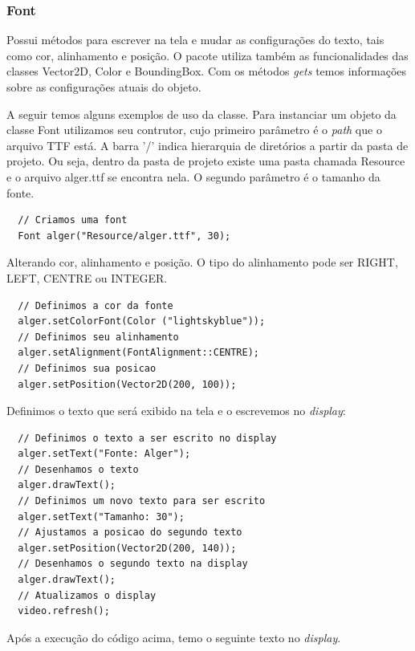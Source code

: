 \subsubsection{Font}
%
%
Possui métodos para escrever na tela e mudar as configurações do texto, tais como cor, alinhamento e posição. O pacote utiliza também as funcionalidades das classes Vector2D, Color e BoundingBox. Com os métodos \textit{gets} temos informações sobre as configurações atuais do objeto.
\par 
A seguir temos alguns exemplos de uso da classe. Para instanciar um objeto da classe Font utilizamos seu contrutor, cujo primeiro parâmetro é o \textit{path} que o arquivo TTF está. A barra '/' indica hierarquia de diretórios a partir da pasta de projeto. Ou seja, dentro da pasta de projeto existe uma pasta chamada Resource e o arquivo alger.ttf se encontra nela. O segundo parâmetro é o tamanho da fonte.
%
\begin{lstlisting}
  // Criamos uma font
  Font alger("Resource/alger.ttf", 30);
\end{lstlisting}
%
\par
Alterando cor, alinhamento e posição. O tipo do alinhamento pode ser RIGHT, LEFT, CENTRE ou INTEGER.
%
\begin{lstlisting}
  // Definimos a cor da fonte
  alger.setColorFont(Color ("lightskyblue"));
  // Definimos seu alinhamento
  alger.setAlignment(FontAlignment::CENTRE);
  // Definimos sua posicao
  alger.setPosition(Vector2D(200, 100));
\end{lstlisting}
%
\par 
Definimos o texto que será exibido na tela e o escrevemos no \textit{display}:
%
\begin{lstlisting}
  // Definimos o texto a ser escrito no display
  alger.setText("Fonte: Alger");
  // Desenhamos o texto
  alger.drawText();
  // Definimos um novo texto para ser escrito
  alger.setText("Tamanho: 30");
  // Ajustamos a posicao do segundo texto
  alger.setPosition(Vector2D(200, 140));
  // Desenhamos o segundo texto na display
  alger.drawText();
  // Atualizamos o display
  video.refresh();
\end{lstlisting}
%
Após a execução do código acima, temo o seguinte texto no \textit{display}.
%
%
%
